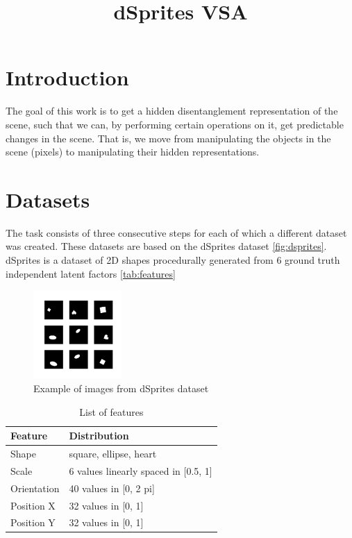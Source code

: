 \documentclass{article}
\title{dSprites VSA}
\author{ }
\date{ }
\begin{document}
    \maketitle


    \section{Introduction}

    The goal of this work is to get a hidden disentanglement representation
    of the scene, such that we can, by performing certain operations on it,
    get predictable changes in the scene. That is, we move from manipulating
    the objects in the scene (pixels) to manipulating their hidden representations.


    \section{Datasets}
    The task consists of three consecutive steps for each of
    which a different dataset was created. These datasets are based on
    the dSprites dataset \autoref{fig:dsprites}.
    dSprites is a dataset of 2D shapes procedurally generated
    from 6 ground truth independent latent factors \autoref{tab:features}


    \begin{figure}[ht]
        \centering
        \includegraphics[width=0.3\textwidth]{img/datasets/dsprites}
        \caption{Example of images from dSprites dataset}
        \label{fig:dsprites}
    \end{figure}

    \begin{table}[ht]
        \centering
        \caption{List of features}
        \label{tab:features}
        \begin{tabular}[t]{ll}
            \hline
            Feature     & Distribution                         \\
            \hline
            Shape       & square, ellipse, heart               \\
            Scale       & 6 values linearly spaced in [0.5, 1] \\
            Orientation & 40 values in [0, 2 pi]               \\
            Position X  & 32 values in [0, 1]                  \\
            Position Y  & 32 values in [0, 1]                  \\
            \hline
        \end{tabular}
    \end{table}
\end{document}
